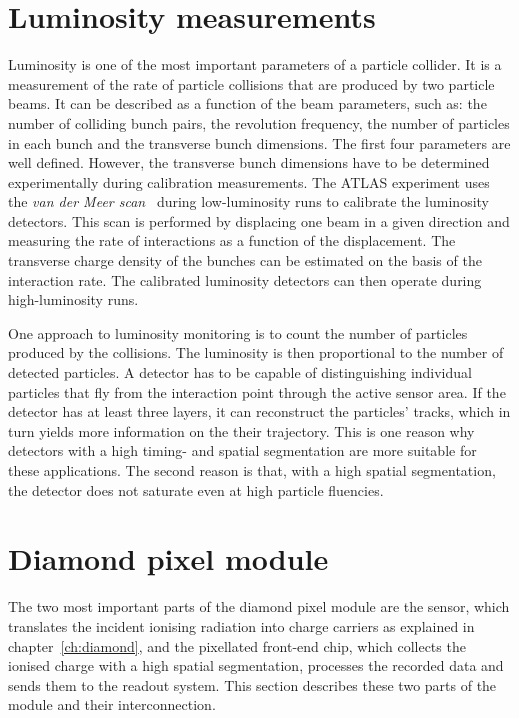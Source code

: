 \section{Luminosity measurements}
\label{sec:lummeas}
 \label{sec:lumi}
Luminosity is one of the most important parameters of a particle collider. It is a measurement of the rate of particle collisions that are produced by two particle beams. It can be described as a function of the beam parameters, such as: the number of colliding bunch pairs, the revolution frequency, the number of particles in each bunch and the transverse bunch dimensions. The first four parameters are well defined. However, the transverse bunch dimensions have to be determined experimentally during calibration measurements. The ATLAS experiment uses the \emph{van der Meer scan}~\cite{ATLAS-CONF-2010-102} during low-luminosity runs to calibrate the luminosity detectors. This scan is performed by displacing one beam in a given direction and measuring the rate of interactions as a function of the displacement. The transverse charge density of the bunches can be estimated on the basis of the interaction rate. The calibrated luminosity detectors can then operate during high-luminosity runs.

One approach to luminosity monitoring is to count the number of particles produced by the collisions. The luminosity is then proportional to the number of detected particles. A detector has to be capable of distinguishing individual particles that fly from the interaction point through the active sensor area. If the detector has at least three layers, it can reconstruct the particles' tracks, which in turn yields more information on the their trajectory. This is one reason why detectors with a high timing- and spatial segmentation are more suitable for these applications. The second reason is that, with a high spatial segmentation, the detector does not saturate even at high particle fluencies.





\section{Diamond pixel module}
\label{sec:atlasdbm}
The two most important parts of the diamond pixel module are the sensor, which translates the incident ionising radiation into charge carriers as explained in chapter~\ref{ch:diamond}, and the pixellated front-end chip, which collects the ionised charge with a high spatial segmentation, processes the recorded data and sends them to the readout system. This section describes these two parts of the module and their interconnection.

